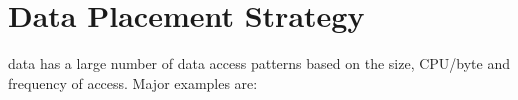 \documentclass[../main-v1.tex]{subfiles}
\begin{document}
\section{Data Placement Strategy}



 data has a large number of data access patterns based on the size, CPU/byte and frequency of access.   Major examples are:
\end{document}
